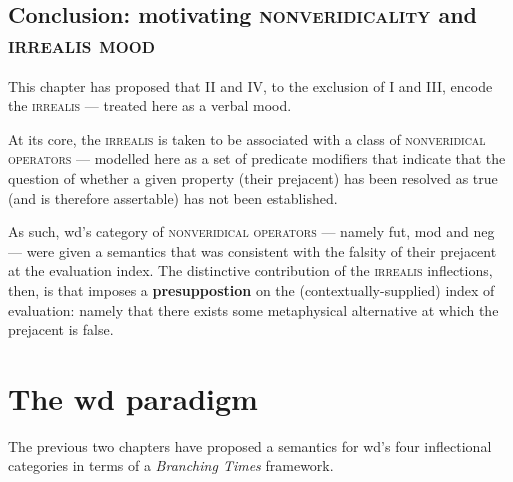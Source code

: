 \section{Conclusion: motivating \textsc{nonveridicality} and \textsc{irrealis mood}}


This chapter has proposed that \gls{II} and \gls{IV}, to the exclusion of \gls{I} and \gls{III}, encode the \textsc{irrealis} --- treated here as a verbal mood.

At its core, the \textsc{irrealis} is taken to be associated with a class of \textsc{nonveridical operators} --- modelled here as a set of predicate modifiers that indicate that the question of whether a given property (their prejacent) has been resolved as true (and is therefore assertable) has not been established. 

As such, \gls{wd}'s category of \textsc{nonveridical operators} --- namely \gls{fut}, \gls{mod} and \gls{neg} --- were given a semantics that was consistent with the falsity of their prejacent at the evaluation index. The distinctive contribution of the \textsc{irrealis} inflections, then, is that imposes a \textbf{presuppostion} on the (contextually-supplied) index of evaluation: namely that there exists some metaphysical alternative at which the prejacent is false.




\chapter{The \gls{wd} paradigm}

The previous two chapters have proposed a semantics for \gls{wd}'s four inflectional categories in terms of a \textit{Branching Times} framework. 




